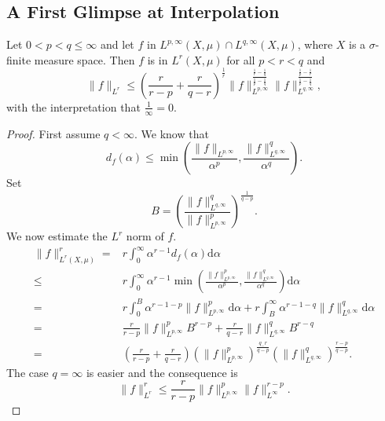 \subsection{A First Glimpse at Interpolation}
\begin{proposition}
  Let $0<p<q\le \infty$ and let $f$ in $L^{p,\infty}(X,\mu)\cap L^{q,\infty}(X,\mu)$, where $X$ is a $\sigma$-finite measure space. Then $f$ is in $L^{r}(X,\mu)$ for all $p<r<q$ and
  \begin{equation}
    \|f\|_{L^{r}}\le \left( \frac{r}{r-p}+\frac{r}{q-r} \right) ^{\frac{1}{r}}\|f\|_{L^{p,\infty}}^{\frac{\frac{1}{r}-\frac{1}{q}}{\frac{1}{p}-\frac{1}{q}}}\|f\|_{L^{q,\infty}}^{\frac{\frac{1}{p}-\frac{1}{r}}{\frac{1}{p}-\frac{1}{q}}},
  \end{equation}
  with the interpretation that $\frac{1}{\infty}=0$.
\end{proposition}
\begin{proof}
  First assume $q<\infty$. We know that 
  \begin{equation}
    d_f(\alpha)\le \min\left( \frac{\|f\|_{L^{p,\infty}}}{\alpha ^{p}},\frac{\|f\|_{L^{q,\infty}}^{q}}{\alpha ^{q}} \right) .
  \end{equation}
  Set 
  \begin{equation}
    B=\left( \frac{\|f\|_{L^{q,\infty}}^{q}}{\|f\|_{L^{p,\infty}}^{p}} \right) ^{\frac{1}{q-p}}.
  \end{equation}
  We now estimate the $L^{r}$ norm of $f$. 
  \begin{equation*}
    \begin{aligned}
      \|f\|_{L^{r}(X,\mu)}^{r}= & r\int_0^{\infty}\alpha ^{r-1}d_f(\alpha)\mathrm{d}\alpha\\
      \le &r\int_0^{\infty}\alpha ^{r-1}\min\left(  \frac{\|f\|_{L^{p,\infty}}^{p}}{\alpha ^{p}},\frac{\|f\|_{L^{q,\infty}}^{q}}{\alpha ^{q}} \right) \mathrm{d}\alpha\\
      =&r \int_0^{B}\alpha ^{r-1-p}\|f\|_{L^{p,\infty}}^{p}\mathrm{d}\alpha+r\int_B^{\infty}\alpha ^{r-1-q}\|f\|_{L^{q,\infty}}^{q}\mathrm{d}\alpha\\
      =&\frac{r}{r-p}\|f\|^{p}_{L^{p,\infty}}B^{r-p}+\frac{r}{q-r}\|f\|_{L^{q,\infty}}^{q}B^{r-q}\\
      =& \left( \frac{r}{r-p}+\frac{r}{q-r} \right) \left( \|f\|_{L^{p,\infty}}^{p} \right) ^{\frac{q_-r}{q-p}}\left( \|f\|_{L^{q,\infty}}^{q} \right) ^{\frac{r-p}{q-p}}. 
    \end{aligned}
  \end{equation*}
  The case $q=\infty$ is easier and the consequence is 
  \[
  \|f\|_{L^{r}}^{r}\le \frac{r}{r-p}\|f\|_{L^{p,\infty}}^{p}\|f\|_{L^{\infty}}^{r-p}.
  \] 
\end{proof}
